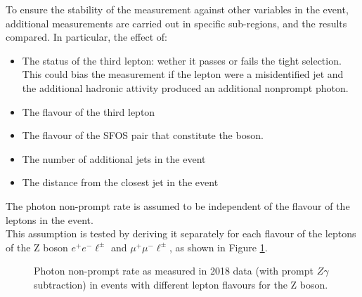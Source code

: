 To ensure the stability of the measurement against other variables in the event,
additional measurements are carried out in specific sub-regions, and the results compared.
In particular, the effect of:
\begin{itemize}
\item The status of the third lepton: wether it passes or fails the tight selection.
  This could bias the measurement if the lepton were a misidentified jet and the additional hadronic attivity produced an additional nonprompt photon.
\item The flavour of the third lepton
\item The flavour of the SFOS pair that constitute the \PZ boson.
\item The number of additional jets in the event
\item The distance from the closest jet in the event
\end{itemize}


The photon non-prompt rate is assumed to be independent of the flavour of the leptons in the event.\\
This assumption is tested by deriving it separately for each flavour of the leptons of the Z boson $e^+ e^- \ell^\pm$ and $\mu^+ \mu^- \ell^\pm$, as shown in Figure \ref{fig:phFR_2e2m}.

\begin{figure}
\caption{Photon non-prompt rate as measured in 2018 data (with prompt $Z\gamma$ subtraction) in events with different lepton flavours for the Z boson.}
\label{fig:phFR_2e2m}
\end{figure}

